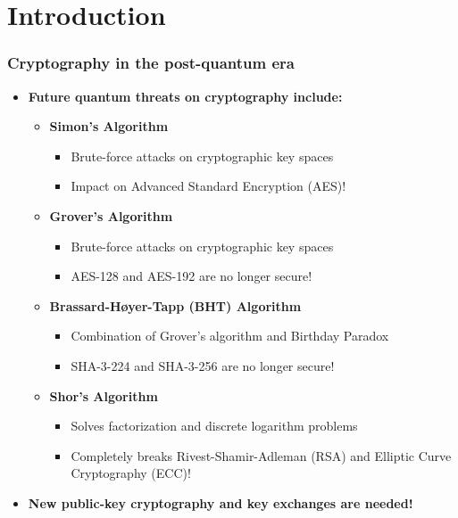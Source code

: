 \documentclass{beamer}
\begin{document}
	\section{Introduction}
 
		\begin{frame}
			\frametitle{\LARGE Cryptography in the post-quantum era}

            \vspace{2ex}
			\begin{itemize}
                \item \textbf{Future quantum threats on cryptography include:}
                \begin{itemize}
                    \item \textbf{Simon's Algorithm}
                    \begin{itemize}
                        \item Brute-force attacks on cryptographic key spaces
                        \item Impact on Advanced Standard Encryption (AES)!
                    \end{itemize}
                    \item \textbf{Grover's Algorithm}
                    \begin{itemize}
                        \item Brute-force attacks on cryptographic key spaces
                        \item AES-128 and AES-192 are no longer secure!
                    \end{itemize}
                    \item \textbf{Brassard-H{\o}yer-Tapp (BHT) Algorithm}
                    \begin{itemize}
                        \item Combination of Grover's algorithm and Birthday Paradox
                        \item SHA-3-224 and SHA-3-256 are no longer secure!
                    \end{itemize}
                    \item \textbf{Shor's Algorithm}
                    \begin{itemize}
                        \item Solves factorization and discrete logarithm problems
                        \item Completely breaks Rivest-Shamir-Adleman (RSA) and Elliptic Curve Cryptography (ECC)!
                    \end{itemize}
                \end{itemize}
                \vspace{1ex}
                \small
                \item \textbf{New public-key cryptography and key exchanges are needed!}
            \end{itemize}
		\end{frame}
\end{document}
